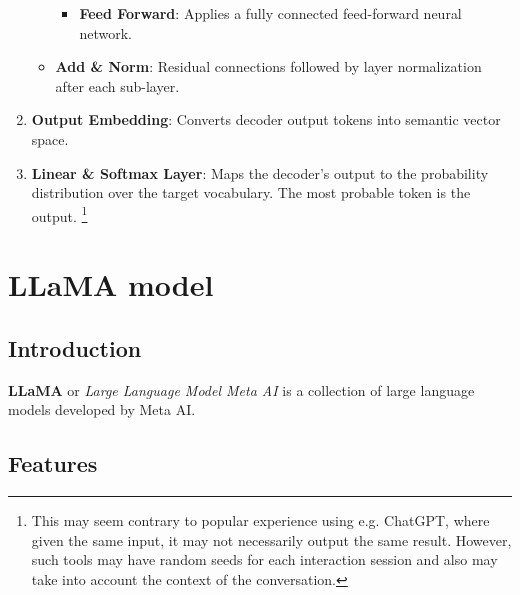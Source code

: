 \begin{enumerate}
\begin{itemize}
\begin{itemize}
			            \item \textbf{Feed Forward}: Applies a fully connected feed-forward neural network.
		            \end{itemize}
		      \item \textbf{Add \& Norm}: Residual connections followed by layer normalization after each sub-layer.
	      \end{itemize}
	\item \textbf{Output Embedding}: Converts decoder output tokens into semantic vector space.
	\item \textbf{Linear \& Softmax Layer}: Maps the decoder’s output to the probability distribution over the target vocabulary. The most probable token is the output. \footnote{This may seem contrary to popular experience using e.g. ChatGPT, where given the same input, it may not necessarily output the same result. However, such tools may have random seeds for each interaction session and also may take into account the context of the conversation. }
\end{enumerate}




\section{LLaMA model}

\subsection{Introduction}
\textbf{LLaMA} or \textit{Large Language Model Meta AI} \cite{llama} is a collection of large language models developed by Meta AI.

\subsection{Features}

